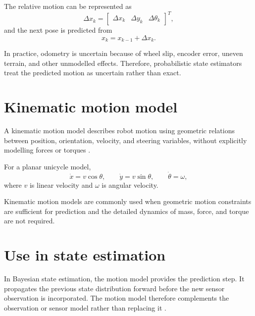 \documentclass[a4paper]{article}
\begin{document}
      The relative motion can be represented as
      \[
         \Delta x_k =
         \begin{bmatrix}
            \Delta x_k &
            \Delta y_k &
            \Delta \theta_k
         \end{bmatrix}^{T},
      \]
      and the next pose is predicted from
      \[
         x_k = x_{k-1} + \Delta x_k.
      \]

      In practice, odometry is uncertain because of wheel slip, encoder error, uneven terrain, and other unmodelled effects. Therefore, probabilistic state estimators treat the predicted motion as uncertain rather than exact.

   \section{Kinematic motion model}
      A kinematic motion model describes robot motion using geometric relations between position, orientation, velocity, and steering variables, without explicitly modelling forces or torques \cite{siegwart-2011-introduction-to-autonomous-mobile-robots,siciliano-2016-springer-handbook-of-robotics}.

      For a planar unicycle model,
      \[
         \dot{x}=v\cos\theta,
         \qquad
         \dot{y}=v\sin\theta,
         \qquad
         \dot{\theta}=\omega,
      \]
      where $v$ is linear velocity and $\omega$ is angular velocity.

      Kinematic motion models are commonly used when geometric motion constraints are sufficient for prediction and the detailed dynamics of mass, force, and torque are not required.

   \section{Use in state estimation}
      In Bayesian state estimation, the motion model provides the prediction step. It propagates the previous state distribution forward before the new sensor observation is incorporated. The motion model therefore complements the observation or sensor model rather than replacing it \cite{thrun-2005-probabilistic-robotics}.

   
   
\end{document}
